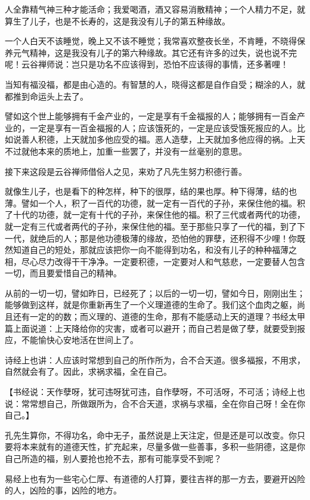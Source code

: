 \documentclass[12pt,twoside,openany]{book}
\newcommand{\kai}[1]{{\CJKfamily{kai}#1}}
\begin{document}
人全靠精气神三种才能活命；我爱喝酒，酒又容易消散精神；一个人精力不足，就算生了儿子，也是不长寿的，这是我没有儿子的第五种缘故。

一个人白天不该睡觉，晚上又不该不睡觉；我常喜欢整夜长坐，不肯睡，不晓得保养元气精神，这是我没有儿子的第六种缘故。其它还有许多的过失，说也说不完呢！云谷禅师说：岂只是功名不应该得到，恐怕不应该得的事情，还多著哩！

当知有福没福，都是由心造的。有智慧的人，晓得这都是自作自受；糊涂的人，就都推到命运头上去了。

譬如这个世上能够拥有千金产业的，一定是享有千金福报的人；能够拥有一百金产业的，一定是享有一百金福报的人；应该饿死的，一定是应该受饿死报应的人。比如说善人积德，上天就加多他应受的福。恶人造孽，上天就加多他应得的祸。上天不过就他本来的质地上，加重一些罢了，并没有一丝毫别的意思。

接下来这段是云谷禅师借俗人之见，来劝了凡先生努力积德行善。

就像生儿子，也是看下的种怎样，种下的很厚，结的果也厚。种下得薄，结的也薄。譬如一个人，积了一百代的功德，就一定有一百代的子孙，来保住他的福。积了十代的功德，就一定有十代的子孙，来保住他的福。积了三代或者两代的功德，就一定有三代或者两代的子孙，来保住他的福。至于那些只享了一代的福，到了下一代，就绝后的人；那是他功德极薄的缘故，恐怕他的罪孽，还积得不少哩！你既然知道自己的短处，那就应该把你一向不能得到功名，和没有儿子的种种福薄之相，尽心尽力改得干干净净。一定要积德，一定要对人和气慈悲，一定要替人包含一切，而且要爱惜自己的精神。

从前的一切一切，譬如昨日，已经死了；以后的一切一切，譬如今日，刚刚出生；能够做到这样，就是你重新再生了一个义理道德的生命了。我们这个血肉之躯，尚且还有一定的的数；而义理的、道德的生命，那有不能感动上天的道理？书经太甲篇上面说道：上天降给你的灾害，或者可以避开；而自己若是做了孽，就要受到报应，不能愉快心安地活在世间上了。

诗经上也讲：人应该时常想到自己的所作所为，合不合天道。很多福报，不用求，自然就会有了。因此，求祸求福，全在自己。

【\kai{书经说：天作孽呀，犹可违呀犹可违，自作孽呀，不可活呀，不可活；诗经上也说：常常想自己，所做跟所为，合不合天道，求祸与求福，全在你自己呀！全在你自己。}】

孔先生算你，不得功名，命中无子，虽然说是上天注定，但是还是可以改变。你只要将本来就有的道德天性，扩充起来，尽量多做一些善事，多积一些阴德，这是你自己所造的福，别人要抢也抢不去，那有可能享受不到呢？

易经上也有为一些宅心仁厚、有道德的人打算，要往吉祥的那一方去，要避开凶险的人，凶险的事，凶险的地方。
\end{document}
